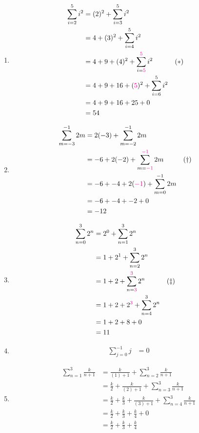 \begin{enumerate}
  \item \begin{align*}
    \sum_{i=2}^{5} i^2 &= (2)^2 + \sum_{i=3}^{5} i^2\\
    &= 4 + (3)^2 + \sum_{i=4}^{5} i^2\\
    &= 4 + 9 + (4)^2 + \sum_{i={\color{magenta}5}}^{{\color{magenta}5}} i^2 && (*)\\
    &= 4 + 9 + 16 + ({\color{magenta}5})^2 + \sum_{i=6}^{5} i^2\\
    &= 4 + 9 + 16 + 25 + 0\\
    &= 54
  \end{align*}

  \item \begin{align*}
    \sum_{m=-3}^{-1} 2m  &= 2(-3) + \sum_{m=-2}^{-1} 2m\\
    &= -6 + 2(-2) + \sum_{m={\color{magenta}-1}}^{{\color{magenta}-1}} 2m  && (\dag)\\
    &= -6 + -4 + 2({\color{magenta}-1}) + \sum_{m=0}^{-1} 2m\\
    &= -6 + -4 + -2 + 0\\
    &= -12
  \end{align*}

  \item \begin{align*}
    \sum_{n=0}^{3} 2^n &= 2^0 + \sum_{n=1}^{3} 2^n\\
    &= 1 + 2^1 + \sum_{n=2}^{3} 2^n\\
    &= 1 + 2 + \sum_{n={\color{magenta}3}}^{{\color{magenta}3}} 2^n  && (\ddag)\\
    &= 1 + 2 + 2^{\color{magenta}3} + \sum_{n=4}^{3} 2^n\\
    &= 1 + 2 + 8 + 0\\
    &= 11
  \end{align*}

  \item \begin{align*}
    \sum_{j=0}^{-1} j &= 0
  \end{align*}

  \item \begin{align*}
    \sum_{n=1}^{3} \frac{k}{n+1} &= \frac{k}{(1)+1} + \sum_{n=2}^{3} \frac{k}{n+1}\\
    &= \frac{k}{2} + \frac{k}{(2)+1} + \sum_{n=3}^{3} \frac{k}{n+1}\\
    &= \frac{k}{2} + \frac{k}{3} + \frac{k}{(3)+1} + \sum_{n=4}^{3} \frac{k}{n+1}\\
    &= \frac{k}{2} + \frac{k}{3} + \frac{k}{4} + 0\\
    &= \frac{k}{2} + \frac{k}{3} + \frac{k}{4}\\
  \end{align*}
\end{enumerate}



